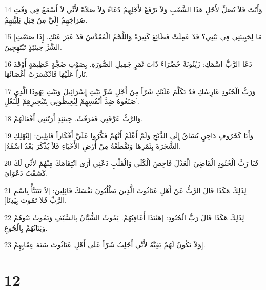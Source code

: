 \par 14 وَأَنْتَ فَلاَ تُصَلِّ لأَجْلِ هَذَا الشَّعْبِ وَلاَ تَرْفَعْ لأَجْلِهِمْ دُعَاءً وَلاَ صَلاَةً لأَنِّي لاَ أَسْمَعُ فِي وَقْتِ صُرَاخِهِمْ إِلَيَّ مِنْ قِبَلِ بَلِيَّتِهِمْ.
\par 15 [مَا لِحَبِيبَتِي فِي بَيْتِي؟ قَدْ عَمِلَتْ فَظَائِعَ كَثِيرَةً وَاللَّحْمُ الْمُقَدَّسُ قَدْ عَبَرَ عَنْكِ. إِذَا صَنَعْتِ الشَّرَّ حِينَئِذٍ تَبْتَهِجِينَ.
\par 16 دَعَا الرَّبُّ اسْمَكِ: زَيْتُونَةً خَضْرَاءَ ذَاتَ ثَمَرٍ جَمِيلِ الصُّورَةِ. بِصَوْتِ ضَجَّةٍ عَظِيمَةٍ أَوْقَدَ نَاراً عَلَيْهَا فَانْكَسَرَتْ أَغْصَانُهَا.
\par 17 وَرَبُّ الْجُنُودِ غَارِسُكِ قَدْ تَكَلَّمَ عَلَيْكِ شَرّاً مِنْ أَجْلِ شَرِّ بَيْتِ إِسْرَائِيلَ وَبَيْتِ يَهُوذَا الَّذِي صَنَعُوهُ ضِدَّ أَنْفُسِهِمْ لِيُغِيظُونِي بِتَبْخِيرِهِمْ لِلْبَعْلِ].
\par 18 وَالرَّبُّ عَرَّفَنِي فَعَرَفْتُ. حِينَئِذٍ أَرَيْتَنِي أَفْعَالَهُمْ.
\par 19 وَأَنَا كَخَرُوفٍ دَاجِنٍ يُسَاقُ إِلَى الذَّبْحِ وَلَمْ أَعْلَمْ أَنَّهُمْ فَكَّرُوا عَلَيَّ أَفْكَاراً قَائِلِينَ: [لِنُهْلِكِ الشَّجَرَةَ بِثَمَرِهَا وَنَقْطَعْهُ مِنْ أَرْضِ الأَحْيَاءِ فَلاَ يُذْكَرَ بَعْدُ اسْمُهُ].
\par 20 فَيَا رَبَّ الْجُنُودِ الْقَاضِيَ الْعَدْلَ فَاحِصَ الْكُلَى وَالْقَلْبِ دَعْنِي أَرَى انْتِقَامَكَ مِنْهُمْ لأَنِّي لَكَ كَشَفْتُ دَعْوَايَ.
\par 21 لِذَلِكَ هَكَذَا قَالَ الرَّبُّ عَنْ أَهْلِ عَنَاثُوثَ الَّذِينَ يَطْلُبُونَ نَفْسَكَ قَائِلِينَ: [لاَ تَتَنَبَّأْ بِاسْمِ الرَّبِّ فَلاَ تَمُوتَ بِيَدِنَا].
\par 22 لِذَلِكَ هَكَذَا قَالَ رَبُّ الْجُنُودِ: [هَئَنَذَا أُعَاقِبُهُمْ. يَمُوتُ الشُّبَّانُ بِالسَّيْفِ وَيَمُوتُ بَنُوهُمْ وَبَنَاتُهُمْ بِالْجُوعِ.
\par 23 وَلاَ تَكُونُ لَهُمْ بَقِيَّةٌ لأَنِّي أَجْلِبُ شَرّاً عَلَى أَهْلِ عَنَاثُوثَ سَنَةَ عِقَابِهِمْ].

\chapter{12}

